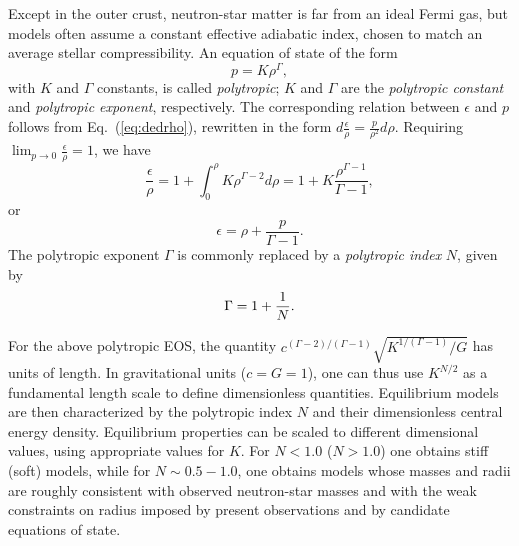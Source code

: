\documentclass[12pt]{article}
\def\be{\begin{equation}}
\def\ee{\end{equation}}
\begin{document}
Except in the outer crust, neutron-star matter is far from an ideal Fermi 
gas, but models often assume a constant effective adiabatic index, chosen to 
match an average stellar compressibility.  An equation of state of the 
form 
\be 
        p = K \rho^\Gamma,
\label{eq:gamma}
\ee 
with $K$ and $\Gamma$ constants, is called {\it polytropic};
$K$ and $\Gamma$ are the {\it polytropic constant} and {\it polytropic
exponent}, respectively. 
The corresponding relation between $\epsilon$ and $p$ follows from 
Eq.~(\ref{eq:dedrho}), rewritten in the form 
$\displaystyle d\frac\epsilon\rho = \frac p{\rho^2} d\rho$.  Requiring 
$\displaystyle\lim_{p\rightarrow 0} \frac\epsilon\rho = 1$, we have  
\[
 \frac\epsilon\rho = 1+ \int_0^\rho K \rho^{\Gamma-2} d\rho 
 = 1+ K\frac {\rho^{\Gamma-1}}{\Gamma-1},
\] 
or 
\be 
        \epsilon = \rho + \frac{p}{\Gamma-1}.
\label{eq:polytrope}\ee
The polytropic exponent $\Gamma$ is commonly 
replaced by a {\em polytropic index} $N$, given by   
\begin{equation}
  \Gamma=1+\frac{1}{N}.
\index{polytrope!polytropic index}\end{equation}

For the above polytropic EOS, the quantity $c^{(\Gamma-2)/(\Gamma-1)}
\sqrt{K^{1/(\Gamma-1)}/G}$ has units of length. In gravitational units
($c=G=1$), one can thus use $K^{N/2}$ as a fundamental length scale to
define dimensionless quantities. Equilibrium models are then
characterized by the polytropic index $N$ and their dimensionless
central energy density. Equilibrium properties can be scaled to
different dimensional values, using appropriate values for $K$.  For
$N<1.0$ ($N>1.0$) one obtains stiff (soft) models, while for $N\sim 0.5
- 1.0$, one obtains models whose masses and radii are roughly consistent 
with observed neutron-star masses and with the weak constraints on radius 
imposed by present observations and by candidate equations of state.
\end{document}
